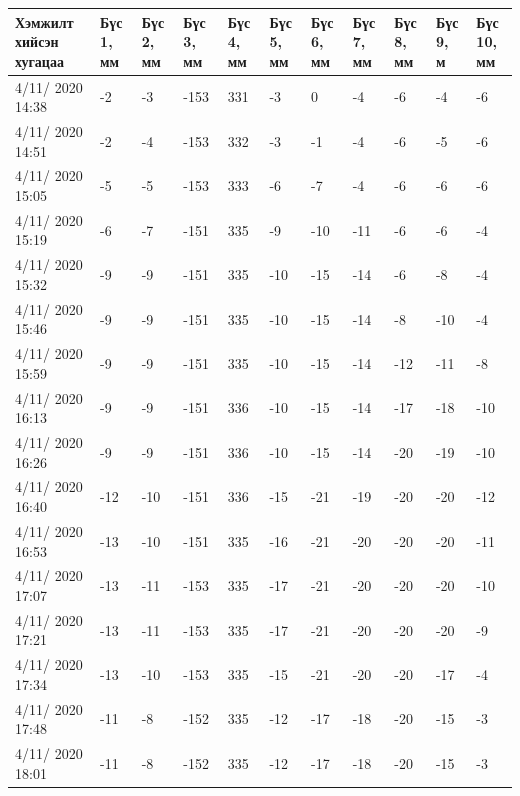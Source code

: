 \begin{table}[h]
    \centering
    \begin{tabular}{|p{1.5cm}|p{0.8cm}|p{0.8cm}|p{0.8cm}|p{0.8cm}|p{0.8cm}|p{0.8cm}|p{0.8cm}|p{0.8cm}|p{0.8cm}|p{0.8cm}|}
         \hline
     Хэмжилт хийсэн хугацаа & Бүс 1, мм&	Бүс 2, мм&	Бүс 3, мм&	Бүс 4, мм&	Бүс 5, мм&	Бүс 6, мм&	Бүс 7, мм&	Бүс 8, мм&	Бүс 9, м&	Бүс 10, мм \\ \hline
4/11/ 2020 14:38&-2&	-3&	-153&331&-3&	0&	-4&	-6&	-4&	-6 \\ \hline
4/11/ 2020 14:51&-2&	-4&	-153&332&-3&	-1&	-4&	-6&	-5&	-6 \\ \hline
4/11/ 2020 15:05&-5&	-5&	-153&333&-6&	-7&	-4&	-6&	-6&	-6 \\ \hline
4/11/ 2020 15:19&-6&	-7&	-151&335&-9&	-10&-11&-6&	-6&	-4 \\ \hline
4/11/ 2020 15:32&-9&	-9&	-151&335&-10&	-15&-14&-6&	-8&	-4 \\ \hline
4/11/ 2020 15:46&-9&	-9&	-151&335&-10&	-15&-14&-8&	-10&	-4 \\ \hline
4/11/ 2020 15:59&-9&	-9&	-151&335&-10&	-15&-14&-12&-11&	-8 \\ \hline
4/11/ 2020 16:13&-9&	-9&	-151&336&-10&	-15&-14&-17&-18&	-10 \\ \hline
4/11/ 2020 16:26&-9&	-9&	-151&336&-10&	-15&-14&-20&-19&	-10 \\ \hline
4/11/ 2020 16:40&-12&	-10&-151&336&-15&	-21&-19&-20&-20&	-12 \\ \hline
4/11/ 2020 16:53&-13&	-10&-151&335&-16&	-21&-20&-20&-20&	-11 \\ \hline
4/11/ 2020 17:07&-13&	-11&-153&335&-17&	-21&-20&-20&-20&	-10 \\ \hline
4/11/ 2020 17:21&-13&	-11&-153&335&-17&	-21&-20&-20&-20&	-9 \\ \hline
4/11/ 2020 17:34&-13&	-10&-153&335&-15&	-21&-20&-20&-17&	-4 \\ \hline
4/11/ 2020 17:48&-11&	-8&	-152&335&-12&	-17&-18&-20&-15&	-3 \\ \hline
4/11/ 2020 18:01&-11&	-8&	-152&335&-12&	-17&-18&-20&-15&	-3 \\ \hline
    \end{tabular}
\end{table}
